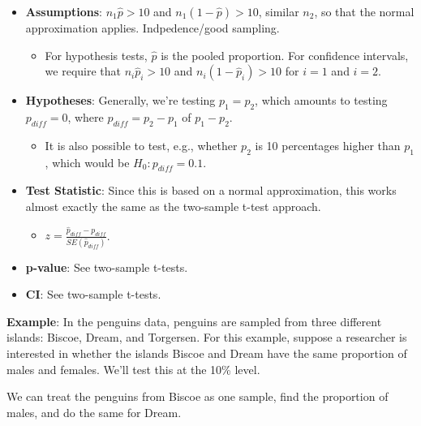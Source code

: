 \documentclass[
  letterpaper,
  DIV=11,
  numbers=noendperiod,
  oneside]{scrreprt}
\newenvironment{Shaded}{\begin{snugshade}}{\end{snugshade}}
\newcommand{\CommentTok}[1]{\textcolor[rgb]{0.37,0.37,0.37}{#1}}
\newcommand{\FunctionTok}[1]{\textcolor[rgb]{0.28,0.35,0.67}{#1}}
\newcommand{\NormalTok}[1]{\textcolor[rgb]{0.00,0.23,0.31}{#1}}
\newcommand{\OtherTok}[1]{\textcolor[rgb]{0.00,0.23,0.31}{#1}}
\newcommand{\SpecialCharTok}[1]{\textcolor[rgb]{0.37,0.37,0.37}{#1}}
\newcommand{\StringTok}[1]{\textcolor[rgb]{0.13,0.47,0.30}{#1}}
\providecommand{\tightlist}{%
  \setlength{\itemsep}{0pt}\setlength{\parskip}{0pt}}\usepackage{longtable,booktabs,array}
\begin{document}
\begin{itemize}
\tightlist
\item
  \textbf{Assumptions}: \(n_1\hat p > 10\) and \(n_1(1 - \hat p)>10\),
  similar \(n_2\), so that the normal approximation applies.
  Indpedence/good sampling.

  \begin{itemize}
  \tightlist
  \item
    For hypothesis tests, \(\hat p\) is the pooled proportion. For
    confidence intervals, we require that \(n_i\hat p_i>10\) and
    \(n_i(1-\hat p_i)>10\) for \(i=1\) and \(i=2\).
  \end{itemize}
\item
  \textbf{Hypotheses}: Generally, we're testing \(p_1 = p_2\), which
  amounts to testing \(p_{diff} = 0\), where \(p_{diff} = p_2 - p_1\) of
  \(p_1 - p_2\).

  \begin{itemize}
  \tightlist
  \item
    It is also possible to test, e.g., whether \(p_2\) is 10 percentages
    higher than \(p_1\), which would be \(H_0:p_{diff} = 0.1\).
  \end{itemize}
\item
  \textbf{Test Statistic}: Since this is based on a normal
  approximation, this works almost exactly the same as the two-sample
  t-test approach.

  \begin{itemize}
  \tightlist
  \item
    \(z = \frac{\hat p_{diff} - p_{diff}}{SE(\hat p_{diff})}\).
  \end{itemize}
\item
  \textbf{p-value}: See two-sample t-tests.
\item
  \textbf{CI}: See two-sample t-tests.
\end{itemize}

\textbf{Example}: In the penguins data, penguins are sampled from three
different islands: Biscoe, Dream, and Torgersen. For this example,
suppose a researcher is interested in whether the islands Biscoe and
Dream have the same proportion of males and females. We'll test this at
the 10\% level.

We can treat the penguins from Biscoe as one sample, find the proportion
of males, and do the same for Dream.

\begin{Shaded}
\end{Shaded}
\end{document}

